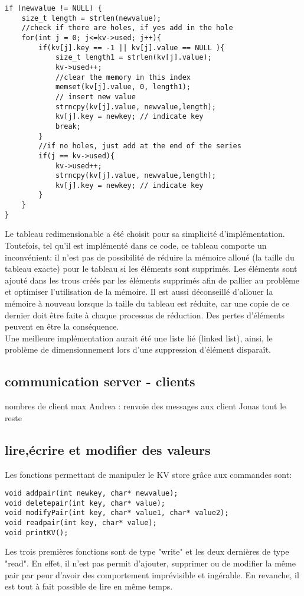 \documentclass[11pt,a4paper]{article}
\begin{document}
\begin{lstlisting}
if (newvalue != NULL) {
	size_t length = strlen(newvalue);
	//check if there are holes, if yes add in the hole
	for(int j = 0; j<=kv->used; j++){
		if(kv[j].key == -1 || kv[j].value == NULL ){
			size_t length1 = strlen(kv[j].value);
			kv->used++;
			//clear the memory in this index
			memset(kv[j].value, 0, length1); 
			// insert new value
			strncpy(kv[j].value, newvalue,length); 
			kv[j].key = newkey; // indicate key
			break;
		}
		//if no holes, just add at the end of the series
		if(j == kv->used){
			kv->used++;
			strncpy(kv[j].value, newvalue,length); 
			kv[j].key = newkey; // indicate key
		}
	}
}
\end{lstlisting}

Le tableau redimensionable a été choisit pour sa simplicité d'implémentation. Toutefois, tel qu'il est implémenté dans ce code, ce tableau comporte un inconvénient: il n'est pas de possibilité de réduire la mémoire alloué (la taille du tableau exacte) pour le tableau si les éléments sont supprimés. Les éléments sont ajouté dans les trous créés par les éléments supprimés afin de pallier au problème et optimiser l'utilisation de la mémoire. Il est aussi déconseillé d'allouer la mémoire à nouveau lorsque la taille du tableau est réduite, car une copie de ce dernier doit être faite à chaque processus de réduction. Des pertes d'éléments peuvent en être la conséquence.\\
Une meilleure implémentation aurait été une liste lié (linked list), ainsi, le problème de dimensionnement lors d'une suppression d'élément disparaît.

\subsection{communication server - clients}
nombres de client max
Andrea : renvoie des messages aux client
Jonas tout le reste
\subsection{lire,écrire et modifier des valeurs}
Les fonctions permettant de manipuler le KV store grâce aux commandes sont:
\begin{lstlisting}
void addpair(int newkey, char* newvalue);
void deletepair(int key, char* value);
void modifyPair(int key, char* value1, char* value2);
void readpair(int key, char* value);
void printKV();
\end{lstlisting}
Les trois premières fonctions sont de type "write" et les deux dernières de type "read". En effet, il n'est pas permit d'ajouter, supprimer ou de modifier la même pair par peur d'avoir des comportement imprévisible et ingérable. En revanche, il est tout à fait possible de lire en même temps.\\
\end{document}
